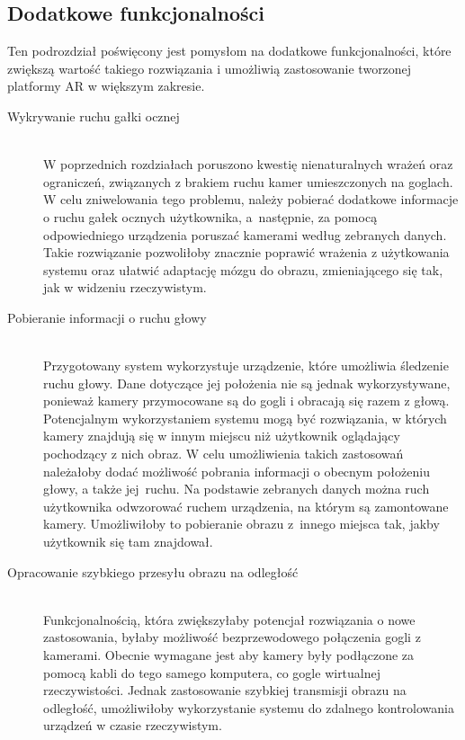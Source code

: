 \documentclass[a4paper,11pt,twoside]{report}
\theoremstyle{definition}
\begin{document}
\subsection{Dodatkowe funkcjonalności}

Ten podrozdział poświęcony jest pomysłom na dodatkowe funkcjonalności, które zwiększą wartość takiego rozwiązania i umożliwią zastosowanie tworzonej platformy AR w większym zakresie.

\begin{description}
\item [Wykrywanie ruchu gałki ocznej] \hfill \\
W poprzednich rozdziałach poruszono kwestię nienaturalnych wrażeń oraz ograniczeń, związanych z brakiem ruchu kamer umieszczonych na goglach. W celu zniwelowania tego problemu, należy pobierać dodatkowe informacje o ruchu gałek ocznych użytkownika, a~następnie, za pomocą odpowiedniego urządzenia poruszać kamerami według zebranych danych. Takie rozwiązanie pozwoliłoby znacznie poprawić wrażenia z użytkowania systemu oraz ułatwić adaptację mózgu do obrazu, zmieniającego się tak, jak w widzeniu rzeczywistym.

\item [Pobieranie informacji o ruchu głowy] \hfill \\
Przygotowany system wykorzystuje urządzenie, które umożliwia śledzenie ruchu głowy. Dane dotyczące jej położenia nie są jednak wykorzystywane, ponieważ kamery przymocowane są do gogli i obracają się razem z głową. Potencjalnym wykorzystaniem systemu mogą być rozwiązania, w których kamery znajdują się w innym miejscu niż użytkownik oglądający pochodzący z nich obraz. W celu umożliwienia takich zastosowań należałoby dodać możliwość pobrania informacji o obecnym położeniu głowy, a także jej~ruchu. Na podstawie zebranych danych można ruch użytkownika odwzorować ruchem urządzenia, na którym są zamontowane kamery. Umożliwiłoby to pobieranie obrazu z~innego miejsca tak, jakby użytkownik się tam znajdował.

\item [Opracowanie szybkiego przesyłu obrazu na odległość] \hfill \\
Funkcjonalnością, która zwiększyłaby potencjał rozwiązania o nowe zastosowania, byłaby możliwość bezprzewodowego połączenia gogli z kamerami. Obecnie wymagane jest aby kamery były podłączone za pomocą kabli do tego samego komputera, co gogle wirtualnej rzeczywistości. Jednak zastosowanie szybkiej transmisji obrazu na odległość, umożliwiłoby wykorzystanie systemu do zdalnego kontrolowania urządzeń w czasie rzeczywistym.

\end{description}
\end{document}

